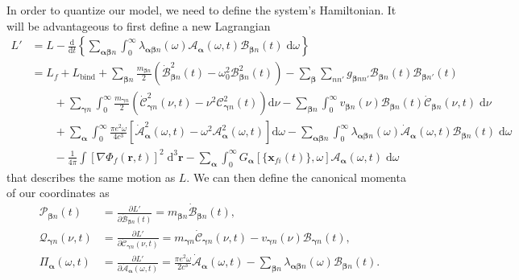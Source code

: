 \documentclass{article}
\begin{document}
In order to quantize our model, we need to define the system's Hamiltonian. It will be advantageous to first define a new Lagrangian
\begin{equation}
\begin{split}
L' &= L - \frac{\mathrm{d}}{\mathrm{d}t}\left\{\sum_{\bm{\alpha}\bm{\beta}n}\int_0^\infty\lambda_{\bm{\alpha}\bm{\beta}n}(\omega)\mathcal{A}_{\bm{\alpha}}(\omega,t)\mathcal{B}_{\bm{\beta}n}(t)\;\mathrm{d}\omega\right\}\\
&= L_f + L_\mathrm{bind} + \sum_{\bm{\beta}n}\frac{m_{\bm{\beta}n}}{2}\left(\dot{\mathcal{B}}_{\bm{\beta}n}^2(t) - \omega_0^2\mathcal{B}_{\bm{\beta}n}^2(t)\right) - \sum_{\bm{\beta}}\sum_{nn'}g_{\bm{\beta}nn'}\mathcal{B}_{\bm{\beta}n}(t)\mathcal{B}_{\bm{\beta}n'}(t)\\
&\qquad+ \sum_{\bm{\gamma}n}\int_0^\infty\frac{m_{\bm{\gamma}n}}{2}\left(\dot{\mathcal{C}}_{\bm{\gamma}n}^2(\nu,t) - \nu^2\mathcal{C}_{\bm{\gamma}n}^2(t)\right)\mathrm{d}\nu - \sum_{\bm{\beta}n}\int_0^\infty v_{\bm{\beta}n}(\nu)\mathcal{B}_{\bm{\beta}n}(t)\dot{\mathcal{C}}_{\bm{\beta}n}(\nu,t)\;\mathrm{d}\nu\\
&\qquad + \sum_{\bm{\alpha}}\int_0^\infty\frac{\pi e^2\omega}{4c^3}\left[\dot{\mathcal{A}}_{\bm{\alpha}}^2(\omega,t) - \omega^2\mathcal{A}_{\bm{\alpha}}^2(\omega,t)\right]\mathrm{d}\omega - \sum_{\bm{\alpha}\bm{\beta}n}\int_0^\infty\lambda_{\bm{\alpha}\bm{\beta}n}(\omega)\dot{\mathcal{A}}_{\bm{\alpha}}(\omega,t)\mathcal{B}_{\bm{\beta}n}(t)\;\mathrm{d}\omega\\
&\qquad - \frac{1}{4\pi}\int\left[\nabla\Phi_f(\mathbf{r},t)\right]^2\;\mathrm{d}^3\mathbf{r} - \sum_{\bm{\alpha}}\int_0^\infty G_{\bm{\alpha}}[\{\mathbf{x}_{fi}(t)\},\omega]\mathcal{A}_{\bm{\alpha}}(\omega,t)\;\mathrm{d}\omega
\end{split}
\end{equation}
that describes the same motion as $L$. We can then define the canonical momenta of our coordinates as
\begin{equation}
\begin{split}
\mathcal{P}_{\bm{\beta}n}(t) &= \frac{\partial L'}{\partial \dot{\mathcal{B}}_{\bm{\beta}n}(t)} = m_{\bm{\beta}n}\dot{\mathcal{B}}_{\bm{\beta}n}(t),\\
\mathcal{Q}_{\bm{\gamma}n}(\nu,t) &= \frac{\partial L'}{\partial \dot{\mathcal{C}}_{\bm{\gamma}n}(\nu,t)} = m_{\bm{\gamma}n}\dot{\mathcal{C}}_{\bm{\gamma}n}(\nu,t) - v_{\bm{\gamma}n}(\nu)\mathcal{B}_{\bm{\gamma}n}(t),\\
\mathit{\Pi}_{\bm{\alpha}}(\omega,t) &= \frac{\partial L'}{\partial \dot{\mathcal{A}}_{\bm{\alpha}}(\omega,t)} = \frac{\pi e^2\omega}{2c^3}\dot{\mathcal{A}}_{\bm{\alpha}}(\omega,t) - \sum_{\bm{\beta}n}\lambda_{\bm{\alpha}\bm{\beta}n}(\omega)\mathcal{B}_{\bm{\beta}n}(t).
\end{split}
\end{equation}
\end{document}

